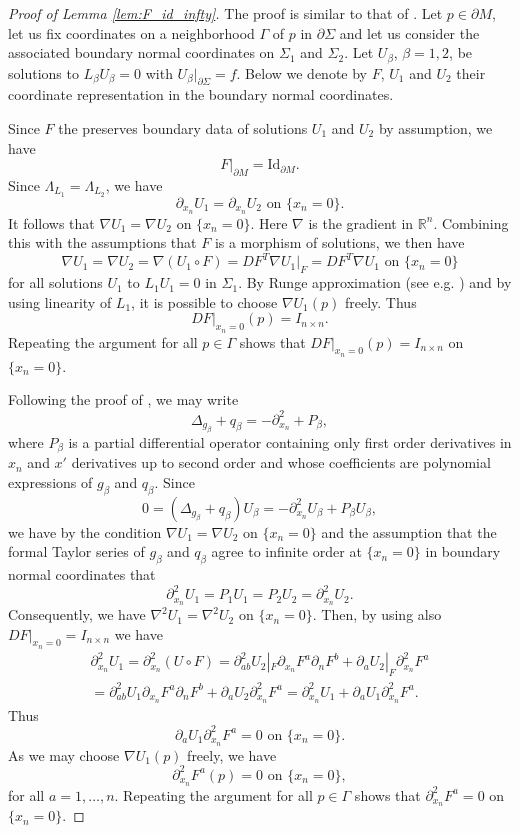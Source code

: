 \documentclass[12pt]{amsart}
\def\p{\partial}
\def\R{\mathbb R}
\theoremstyle{definition}
\theoremstyle{remark}
\begin{document}
\begin{proof}[Proof of Lemma \ref{lem:F_id_infty}]
The proof is similar to that of \cite[Lemma 3.4]{lassas2016calder}. 
 Let $p\in \p M$, let us fix coordinates on a neighborhood $\Gamma$ of $p$ in $\p \Sigma$ and let us consider the associated boundary normal coordinates on $\Sigma_1$ and $\Sigma_2$.  
Let $U_\beta$, $\beta=1,2$, be solutions to $L_\beta U_\beta=0$ with $U_\beta|_{\p \Sigma}=f$.
 Below we denote by $F$, $U_1$ and $U_2$ their coordinate representation in the boundary normal coordinates. 
 
 Since $F$ the preserves boundary data of solutions $U_1$ and $U_2$ by assumption, we have
 \[
  F|_{\p M}=\text{Id}_{\p M}.
 \]
 Since $\Lambda_{L_1}=\Lambda_{L_2}$, we have
 \[
  \p_{x_n}U_1=\p_{x_n}U_2 \text{ on } \{x_n=0\}.
 \]
 It follows that $\nabla U_1=\nabla U_2$ on $\{x_n=0\}$. Here $\nabla$ is the gradient in $\R^n$. Combining this with the assumptions that $F$ is a morphism of solutions, we then have
 \[
  \nabla U_1=\nabla U_2=\nabla(U_1\circ F)=DF^T\nabla U_1|_F=DF^T\nabla U_1 \text{ on } \{x_n=0\}
 \]
 for all solutions $U_1$ to $L_1U_1=0$ in $\Sigma_1$.
 By Runge approximation (see e.g. \cite[Proposition B.1]{lassas2016calder}) and by using linearity of $L_1$, it is possible to choose $\nabla U_1(p)$ freely. Thus 
 \[
  DF|_{x_n=0}(p)=I_{n\times n}.
 \]
 Repeating the argument for all $p\in \Gamma$ shows that $DF|_{x_n=0}(p)=I_{n\times n}$ on $\{x_n=0\}$.
 
 Following the proof of \cite[Lemma 3.4]{lassas2016calder}, we may write
 \[
  \Delta_{g_\beta}+q_\beta=-\p_{x_n}^2+P_\beta,
 \]
 where $P_\beta$ is a partial differential operator containing only first order derivatives in $x_n$ and $x'$ derivatives up to second order and whose coefficients are polynomial expressions of $g_\beta$ and $q_\beta$. Since
 \[
  0=(\Delta_{g_\beta}+q_\beta)U_\beta=-\p_{x_n}^2U_\beta+P_\beta U_\beta,
 \]
 we have by the condition $\nabla U_1=\nabla U_2$ on $\{x_n=0\}$ and the assumption that the formal Taylor series of $g_\beta$ and $q_\beta$ agree to infinite order at $\{x_n=0\}$ in boundary normal coordinates that
 \begin{equation}\label{eq:op_decomp}
  \p_{x_n}^2U_1=P_1 U_1=P_2 U_2=\p_{x_n}^2U_2.
 \end{equation}
 Consequently, we have $\nabla^2 U_1=\nabla^2 U_2$ on $\{x_n=0\}$. 
Then, by using also $DF|_{x_n=0}=I_{n\times n}$ we have
\begin{multline*}
 \p_{x_n}^2U_1=\p_{x_n}^2(U\circ F)= \p_{ab}^2U_2|_F\p_{x_n}F^a\p_nF^b+\p_aU_2|_F\p_{x_n}^2F^a \\
 = \p_{ab}^2U_1\p_{x_n}F^a\p_nF^b+\p_aU_2\p_{x_n}^2F^a=\p_{x_n}^2U_1+\p_aU_1\p_{x_n}^2F^a.
\end{multline*}
Thus
\[
 \p_aU_1\p_{x_n}^2F^a=0 \text{ on } \{x_n=0\}.
\]
As we may choose $\nabla U_1(p)$ freely, we have
 \[
  \p_{x_n}^2F^a(p)=0 \text{ on } \{x_n=0\},
 \]
 for all $a=1,\ldots,n$. Repeating the argument for all $p\in \Gamma$ shows that $\p_{x_n}^2F^a=0$ on $\{x_n=0\}$.
 

\end{proof}
\end{document}

